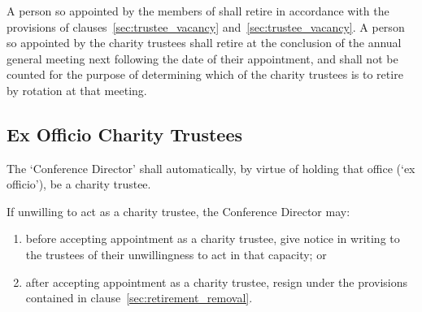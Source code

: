         \subsubsection{}\label{sec:elected_trustee_retirement}
        A person so appointed by the members of \shortname{} shall retire in accordance with the provisions of clauses~\ref{sec:trustee_vacancy} and~\ref{sec:trustee_vacancy}. A person so appointed by the charity trustees shall retire at the conclusion of the annual general meeting next following the date of their appointment, and shall not be counted for the purpose of determining which of the charity trustees is to retire by rotation at that meeting.

    \subsection{Ex Officio Charity Trustees}
    The `Conference Director' shall automatically, by virtue of holding that office (`ex officio'), be a charity trustee.

    If unwilling to act as a charity trustee, the Conference Director may:
    \begin{enumerate}
        \item before accepting appointment as a charity trustee, give notice in writing to the trustees of their unwillingness to act in that capacity; or
        \item after accepting appointment as a charity trustee, resign under the provisions contained in clause~\ref{sec:retirement_removal}.
    \end{enumerate}
